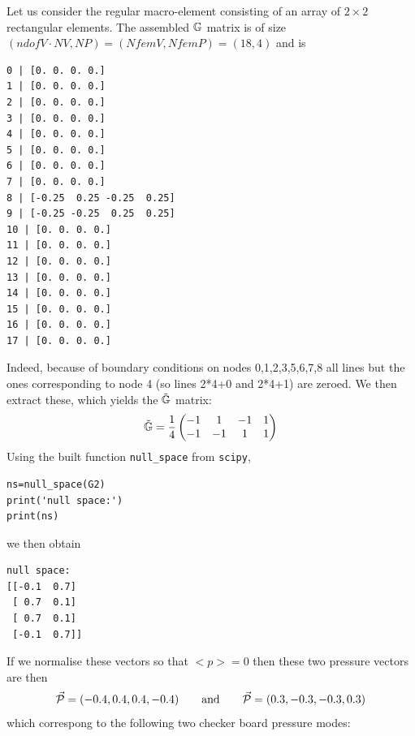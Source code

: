 \begin{center}
\end{center}

Let us consider the regular macro-element consisting of an array of $2\times 2$ rectangular elements. 
The assembled ${\mathbb{G}}$ matrix is of size $(ndofV \cdot NV, NP)=(NfemV,NfemP)=(18,4)$ and is 
{\small
\begin{verbatim}
0 | [0. 0. 0. 0.]
1 | [0. 0. 0. 0.]
2 | [0. 0. 0. 0.]
3 | [0. 0. 0. 0.]
4 | [0. 0. 0. 0.]
5 | [0. 0. 0. 0.]
6 | [0. 0. 0. 0.]
7 | [0. 0. 0. 0.]
8 | [-0.25  0.25 -0.25  0.25]
9 | [-0.25 -0.25  0.25  0.25]
10 | [0. 0. 0. 0.]
11 | [0. 0. 0. 0.]
12 | [0. 0. 0. 0.]
13 | [0. 0. 0. 0.]
14 | [0. 0. 0. 0.]
15 | [0. 0. 0. 0.]
16 | [0. 0. 0. 0.]
17 | [0. 0. 0. 0.]
\end{verbatim}
}
Indeed, because of boundary conditions on nodes 0,1,2,3,5,6,7,8 all lines 
but the ones corresponding to node 4 (so lines 2*4+0 and 2*4+1) are zeroed. 
We then extract these, which yields the $\tilde{{\mathbb{G}}}$ matrix:
\[
\tilde{{\mathbb{G}}}=
\frac14
\begin{pmatrix}
-1 &1 &-1 &1 \\
-1 &-1& 1 &1
\end{pmatrix}
\]
Using the built function \lstinline{null_space} from \lstinline{scipy}, 
\begin{lstlisting}
ns=null_space(G2)
print('null space:')
print(ns)
\end{lstlisting}
we then obtain 
\begin{verbatim}
null space:
[[-0.1  0.7]
 [ 0.7  0.1]
 [ 0.7  0.1]
 [-0.1  0.7]]
\end{verbatim}
If we normalise these vectors so that $<p>=0$ then these two 
pressure vectors are then
\[
\vec{\cal P}=(-0.4,0.4,0.4,-0.4)
\qquad \text{and} \qquad 
\vec{\cal P}=(0.3,-0.3,-0.3,0.3)
\]
which correspong to the following two checker board pressure modes:

